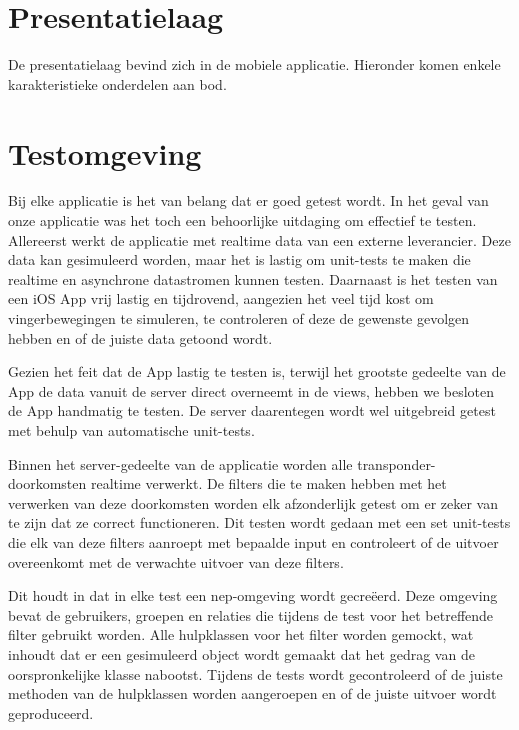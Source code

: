 \section{Presentatielaag}
  De presentatielaag bevind zich in de mobiele applicatie. Hieronder komen enkele karakteristieke onderdelen aan bod.
  

\section{Testomgeving}
Bij elke applicatie is het van belang dat er goed getest wordt. In het geval van onze applicatie was het toch een behoorlijke uitdaging om effectief te testen. Allereerst werkt de applicatie met realtime data van een externe leverancier. Deze data kan gesimuleerd worden, maar het is lastig om unit-tests te maken die realtime en asynchrone datastromen kunnen testen. Daarnaast is het testen van een iOS App vrij lastig en tijdrovend, aangezien het veel tijd kost om vingerbewegingen te simuleren, te controleren of deze de gewenste gevolgen hebben en of de juiste data getoond wordt.

Gezien het feit dat de App lastig te testen is, terwijl het grootste gedeelte van de App de data vanuit de server direct overneemt in de views, hebben we besloten de App handmatig te testen. De server daarentegen wordt wel uitgebreid getest met behulp van automatische unit-tests. 

Binnen het server-gedeelte van de applicatie worden alle transponder-doorkomsten realtime verwerkt. De filters die te maken hebben met het verwerken van deze doorkomsten worden elk afzonderlijk getest om er zeker van te zijn dat ze correct functioneren. Dit testen wordt gedaan met een set unit-tests die elk van deze filters aanroept met bepaalde input en controleert of de uitvoer overeenkomt met de verwachte uitvoer van deze filters.

Dit houdt in dat in elke test een nep-omgeving wordt gecreëerd. Deze omgeving bevat de gebruikers, groepen en relaties die tijdens de test voor het betreffende filter gebruikt worden. Alle hulpklassen voor het filter worden gemockt, wat inhoudt dat er een gesimuleerd object wordt gemaakt dat het gedrag van de oorspronkelijke klasse nabootst. Tijdens de tests wordt gecontroleerd of de juiste methoden van de hulpklassen worden aangeroepen en of de juiste uitvoer wordt geproduceerd.

